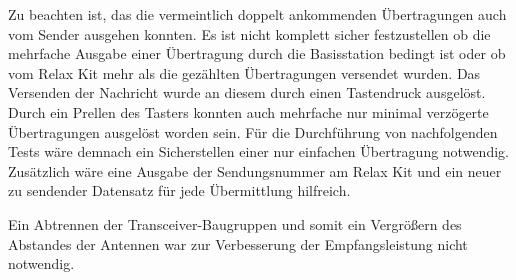 Zu beachten ist, das die vermeintlich doppelt ankommenden Übertragungen auch vom Sender ausgehen konnten. Es ist nicht komplett sicher festzustellen ob die mehrfache Ausgabe einer Übertragung durch die Basisstation  bedingt ist oder ob vom Relax Kit mehr als die gezählten Übertragungen versendet wurden. Das Versenden der Nachricht wurde an diesem durch einen Tastendruck ausgelöst.  Durch ein Prellen des Tasters konnten auch mehrfache nur minimal verzögerte Übertragungen ausgelöst worden sein.
Für die Durchführung von nachfolgenden Tests wäre demnach ein Sicherstellen einer nur einfachen Übertragung notwendig. Zusätzlich wäre eine Ausgabe der Sendungsnummer am Relax Kit und ein neuer zu sendender Datensatz für jede Übermittlung hilfreich.

Ein Abtrennen der Transceiver-Baugruppen und somit ein Vergrößern des Abstandes der Antennen war zur Verbesserung der Empfangsleistung nicht notwendig.